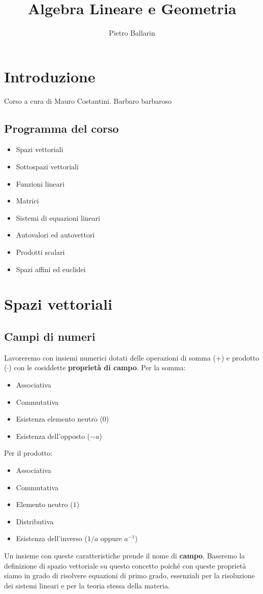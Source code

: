 \documentclass{report}
\title {Algebra Lineare e Geometria}
\author {Pietro Ballarin}
\begin{document}
\maketitle
\tableofcontents

\chapter{Introduzione}
Corso a cura di Mauro Costantini. Barbaro barbaroso

\section {Programma del corso}
\begin{itemize}
    \item Spazi vettoriali
    \item Sottospazi vettoriali
    \item Funzioni lineari
    \item Matrici
    \item Sistemi di equazioni lineari
    \item Autovalori ed autovettori
    \item Prodotti scalari
    \item Spazi affini ed euclidei
\end{itemize}

\chapter{Spazi vettoriali}

\section{Campi di numeri}

Lavoreremo con insiemi numerici dotati delle operazioni di somma ($+$)
e prodotto ($\cdot$) con le cosiddette \textbf{proprietà di campo}.
Per la somma:
\begin{itemize}
    \item Associativa
    \item Commutativa
    \item Esistenza elemento neutro ($0$)
    \item Esistenza dell'opposto ($-a$)
\end{itemize}
Per il prodotto:
\begin{itemize}
    \item Associativa
    \item Commutativa
    \item Elemento neutro ($1$)
    \item Distributiva
    \item Esistenza dell'inverso ($1/a$ oppure $a^{-1}$)
\end{itemize}
Un insieme con queste caratteristiche prende il nome di \textbf{campo}.
Baseremo la definizione di spazio vettoriale su questo concetto poiché
con queste proprietà siamo in grado di risolvere equazioni di primo grado,
essenziali per la risoluzione dei sistemi lineari e per la teoria stessa
della materia.
\end{document}
